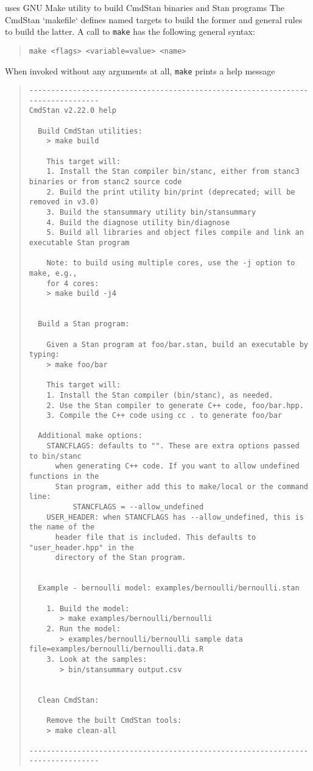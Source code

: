 \CmdStan uses GNU Make utility to build CmdStan binaries and Stan programs
The CmdStan `makefile` defines named targets to build the former and
general rules to build the latter.
A call to {\tt make} has the following general syntax:
%
\begin{quote}
\begin{Verbatim}[fontshape=sl]
make <flags> <variable=value> <name>
\end{Verbatim}
\end{quote}
%
When invoked without any arguments at all, {\tt make} prints a help message
%
\begin{quote}
\begin{Verbatim}[fontsize=\footnotesize,fontshape=sl]
--------------------------------------------------------------------------------
CmdStan v2.22.0 help

  Build CmdStan utilities:
    > make build

    This target will:
    1. Install the Stan compiler bin/stanc, either from stanc3 binaries or from stanc2 source code
    2. Build the print utility bin/print (deprecated; will be removed in v3.0)
    3. Build the stansummary utility bin/stansummary
    4. Build the diagnose utility bin/diagnose
    5. Build all libraries and object files compile and link an executable Stan program

    Note: to build using multiple cores, use the -j option to make, e.g., 
    for 4 cores:
    > make build -j4


  Build a Stan program:

    Given a Stan program at foo/bar.stan, build an executable by typing:
    > make foo/bar

    This target will:
    1. Install the Stan compiler (bin/stanc), as needed.
    2. Use the Stan compiler to generate C++ code, foo/bar.hpp.
    3. Compile the C++ code using cc . to generate foo/bar

  Additional make options:
    STANCFLAGS: defaults to "". These are extra options passed to bin/stanc
      when generating C++ code. If you want to allow undefined functions in the
      Stan program, either add this to make/local or the command line:
          STANCFLAGS = --allow_undefined
    USER_HEADER: when STANCFLAGS has --allow_undefined, this is the name of the
      header file that is included. This defaults to "user_header.hpp" in the
      directory of the Stan program.


  Example - bernoulli model: examples/bernoulli/bernoulli.stan

    1. Build the model:
       > make examples/bernoulli/bernoulli
    2. Run the model:
       > examples/bernoulli/bernoulli sample data file=examples/bernoulli/bernoulli.data.R
    3. Look at the samples:
       > bin/stansummary output.csv


  Clean CmdStan:

    Remove the built CmdStan tools:
    > make clean-all

--------------------------------------------------------------------------------
\end{Verbatim}
\end{quote}
%





